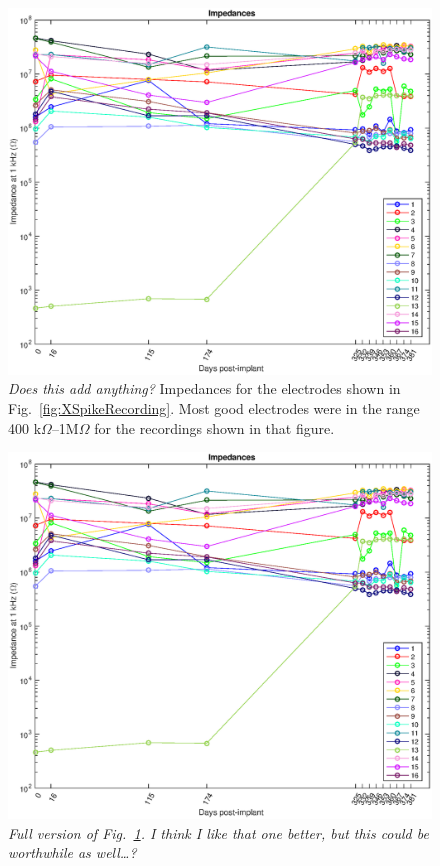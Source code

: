 \documentclass[10pt,letterpaper]{article}
\newcommand\fig[1]{Fig.~\ref{#1}}
\begin{document}
\begin{figure}
  \includegraphics[width=\textwidth]{Impedances}
  \caption{{\em Does this add anything?}
    Impedances for the electrodes shown in \fig{fig:XSpikeRecording}.  Most good electrodes were in the range 400 k$\Omega$--1M$\Omega$ for the recordings shown in that figure.}
  \label{fig:Impedances}
\end{figure}
    


\begin{figure}
  \includegraphics[width=\textwidth]{Impedances-all}
  \caption{{\em Full version of \fig{fig:Impedances}.  I think I like that one better, but this could be worthwhile as well\dots?}}
  \label{fig:Impedances-all}
\end{figure}
    
\end{document}
